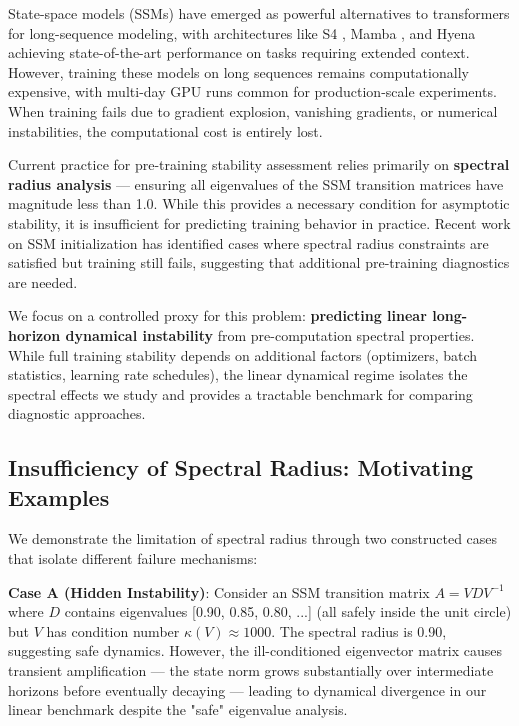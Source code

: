 \documentclass[twoside]{article}
\begin{document}
State-space models (SSMs) have emerged as powerful alternatives to transformers for long-sequence modeling, with architectures like S4 \citep{gu2022efficiently}, Mamba \citep{gu2023mamba}, and Hyena \citep{poli2023hyena} achieving state-of-the-art performance on tasks requiring extended context. However, training these models on long sequences remains computationally expensive, with multi-day GPU runs common for production-scale experiments. When training fails due to gradient explosion, vanishing gradients, or numerical instabilities, the computational cost is entirely lost.

Current practice for pre-training stability assessment relies primarily on \textbf{spectral radius analysis} — ensuring all eigenvalues of the SSM transition matrices have magnitude less than 1.0. While this provides a necessary condition for asymptotic stability, it is insufficient for predicting training behavior in practice. Recent work on SSM initialization \citep{orvieto2023resurrecting} has identified cases where spectral radius constraints are satisfied but training still fails, suggesting that additional pre-training diagnostics are needed.

We focus on a controlled proxy for this problem: \textbf{predicting linear long-horizon dynamical instability} from pre-computation spectral properties. While full training stability depends on additional factors (optimizers, batch statistics, learning rate schedules), the linear dynamical regime isolates the spectral effects we study and provides a tractable benchmark for comparing diagnostic approaches.

\subsection{Insufficiency of Spectral Radius: Motivating Examples}

We demonstrate the limitation of spectral radius through two constructed cases that isolate different failure mechanisms:

\textbf{Case A (Hidden Instability)}: Consider an SSM transition matrix $A = VDV^{-1}$ where $D$ contains eigenvalues [0.90, 0.85, 0.80, ...] (all safely inside the unit circle) but $V$ has condition number $\kappa(V) \approx 1000$. The spectral radius is 0.90, suggesting safe dynamics. However, the ill-conditioned eigenvector matrix causes transient amplification — the state norm grows substantially over intermediate horizons before eventually decaying — leading to dynamical divergence in our linear benchmark despite the "safe" eigenvalue analysis.
\end{document}

